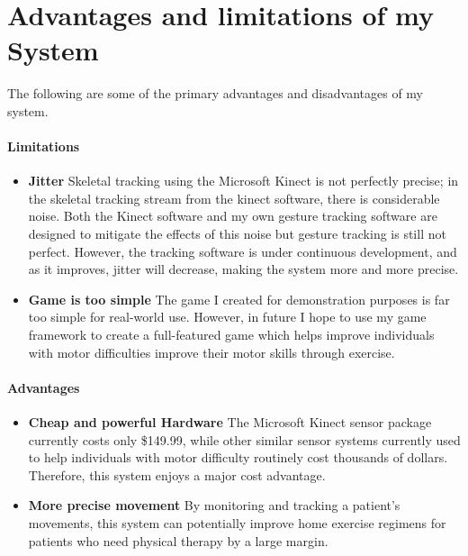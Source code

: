 \documentclass{report}
\begin{document}
\section{Advantages and limitations of my System}

The following are some of the primary advantages and disadvantages of my system.

\paragraph{Limitations}

\begin{itemize}
	\item \textbf{Jitter} Skeletal tracking using the Microsoft Kinect is not perfectly precise; in the skeletal tracking stream from the kinect software, there is considerable noise. Both the Kinect software and my own gesture tracking software are designed to mitigate the effects of this noise but gesture tracking is still not perfect. However, the tracking software is under continuous development, and as it improves, jitter will decrease, making the system more and more precise.

	\item \textbf{Game is too simple} The game I created for demonstration purposes is far too simple for real-world use. However, in future I hope to use my game framework to create a full-featured game which helps improve individuals with motor difficulties improve their motor skills through exercise.
\end{itemize}

\paragraph{Advantages}

\begin{itemize}
	\item \textbf{Cheap and powerful Hardware} The Microsoft Kinect sensor package currently costs only \$149.99, while other similar sensor systems currently used to help individuals with motor difficulty routinely cost thousands of dollars. Therefore, this system enjoys a major cost advantage.

	\item \textbf{More precise movement} By monitoring and tracking a patient's movements, this system can potentially improve home exercise regimens for patients who need physical therapy by a large margin. 
\end{itemize}
\end{document}
